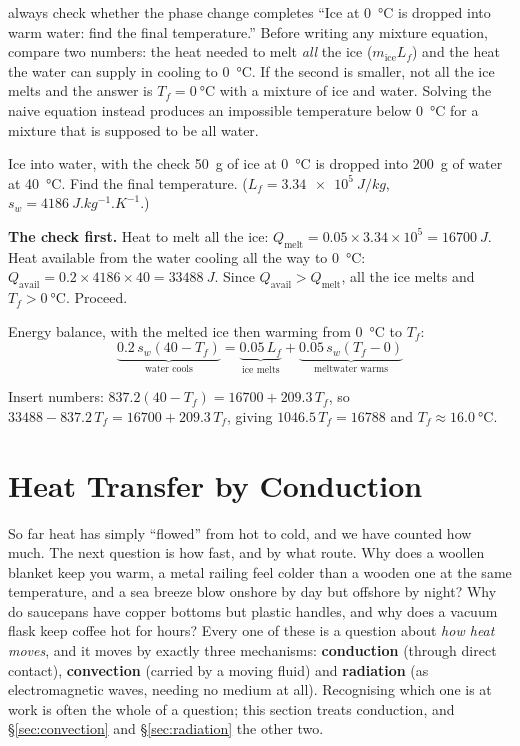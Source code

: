 \begin{trapbox}{always check whether the phase change completes}
``Ice at \SI{0}{\celsius} is dropped into warm water: find the final temperature.'' Before writing any
mixture equation, compare two numbers: the heat needed to melt \emph{all} the ice ($m_{\text{ice}}L_f$)
and the heat the water can supply in cooling to \SI{0}{\celsius}. If the second is smaller, not all the
ice melts and the answer is $T_f = \SI{0}{\celsius}$ with a mixture of ice and water. Solving the naive
equation instead produces an impossible temperature below \SI{0}{\celsius} for a mixture that is
supposed to be all water.
\end{trapbox}

\begin{exbox}{Ice into water, with the check}\label{ex:ice-water}
\SI{50}{g} of ice at \SI{0}{\celsius} is dropped into \SI{200}{g} of water at \SI{40}{\celsius}. Find
the final temperature. ($L_f = \SI{3.34e5}{J/kg}$, $s_w = \SI{4186}{J.kg^{-1}.K^{-1}}$.)

 \textbf{The check first.} Heat to melt all the ice:
$Q_{\text{melt}} = 0.05 \times 3.34\times10^5 = \SI{16700}{J}$.
Heat available from the water cooling all the way to \SI{0}{\celsius}:
$Q_{\text{avail}} = 0.2 \times 4186 \times 40 = \SI{33488}{J}$.
Since $Q_{\text{avail}} > Q_{\text{melt}}$, all the ice melts and $T_f > \SI{0}{\celsius}$. Proceed.

 Energy balance, with the melted ice then warming from \SI{0}{\celsius} to $T_f$:
\[
\underbrace{0.2\,s_w(40 - T_f)}_{\text{water cools}}
= \underbrace{0.05\,L_f}_{\text{ice melts}} + \underbrace{0.05\,s_w(T_f - 0)}_{\text{meltwater warms}}
\]

 Insert numbers: $837.2(40-T_f) = 16700 + 209.3\,T_f$, so
$33488 - 837.2\,T_f = 16700 + 209.3\,T_f$, giving $1046.5\,T_f = 16788$ and
$T_f \approx \SI{16.0}{\celsius}$. 
\end{exbox}

\section{Heat Transfer by Conduction}\label{sec:conduction}

So far heat has simply ``flowed'' from hot to cold, and we have counted how much. The next question is
how fast, and by what route. Why does a woollen blanket keep you warm, a metal railing feel colder than
a wooden one at the same temperature, and a sea breeze blow onshore by day but offshore by night? Why
do saucepans have copper bottoms but plastic handles, and why does a vacuum flask keep coffee hot for
hours? Every one of these is a question about \emph{how heat moves}, and it moves by exactly three
mechanisms: \textbf{conduction} (through direct contact), \textbf{convection} (carried by a moving
fluid) and \textbf{radiation} (as electromagnetic waves, needing no medium at all). Recognising which
one is at work is often the whole of a question; this section treats conduction, and
\S\ref{sec:convection} and \S\ref{sec:radiation} the other two.


